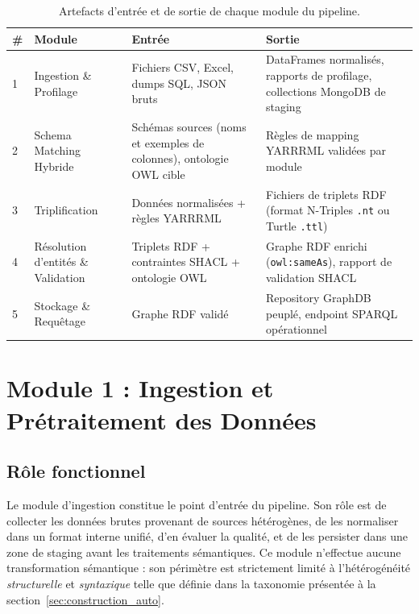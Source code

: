 \begin{table}[ht]
\centering
\caption{Artefacts d'entrée et de sortie de chaque module du pipeline.}
\label{tab:artefacts}
\renewcommand{\arraystretch}{1.35}
\begin{tabular}{|p{0.5cm}|p{3.2cm}|p{4.2cm}|p{4.2cm}|}
\hline
\textbf{\#} & \textbf{Module} & \textbf{Entrée} & \textbf{Sortie} \\
\hline
1 & Ingestion \& Profilage
  & Fichiers CSV, Excel, dumps SQL, JSON bruts
  & DataFrames normalisés, rapports de profilage,
    collections MongoDB de staging \\
\hline
2 & Schema Matching Hybride
  & Schémas sources (noms et exemples de colonnes),
    ontologie OWL cible
  & Règles de mapping YARRRML validées par module \\
\hline
3 & Triplification
  & Données normalisées + règles YARRRML
  & Fichiers de triplets RDF (format N-Triples \texttt{.nt}
    ou Turtle \texttt{.ttl}) \\
\hline
4 & Résolution d'entités \& Validation
  & Triplets RDF + contraintes SHACL + ontologie OWL
  & Graphe RDF enrichi (\texttt{owl:sameAs}),
    rapport de validation SHACL \\
\hline
5 & Stockage \& Requêtage
  & Graphe RDF validé
  & Repository GraphDB peuplé, endpoint SPARQL opérationnel \\
\hline
\end{tabular}
\end{table}

\section{Module 1 : Ingestion et Prétraitement des Données}
\label{sec:module_ingestion}

\subsection{Rôle fonctionnel}

Le module d'ingestion constitue le point d'entrée du pipeline.
Son rôle est de collecter les données brutes provenant de sources hétérogènes,
de les normaliser dans un format interne unifié, d'en évaluer la qualité, et de
les persister dans une zone de staging avant les traitements sémantiques.
Ce module n'effectue aucune transformation sémantique : son périmètre est
strictement limité à l'hétérogénéité \textit{structurelle} et \textit{syntaxique}
telle que définie dans la taxonomie présentée à la section~\ref{sec:construction_auto}.

